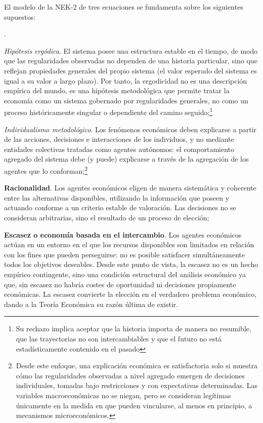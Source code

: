 \documentclass[10pt,a4paper]{article}
\newcounter{numitem}
\newenvironment{lnum}
      {\begin{list}{\arabic{numitem}.}{%
          \usecounter{numitem}%
          \setlength{\leftmargin}{1cm}%
          \setlength{\parskip}{3pt}%
          \setlength{\itemsep}{0pt}%
          \setlength{\parsep}{0pt}%
      }}
      {\end{list}}
\begin{document}
El modelo de la NEK-2 de tres ecuaciones se fundamenta sobre los siguientes supuestos:
\begin{lnum}
    \item \textit{Hipótesis ergódica}. El sistema posee una estructura estable en el tiempo, de modo que las regularidades observadas no dependen de una historia particular, sino que reflejan propiedades generales del propio sistema (el valor esperado del sistema es igual a su valor a largo plazo). Por tanto, la ergodicidad no es una descripción empírica del mundo, es una hipótesis metodológica que permite tratar la economía como un sistema gobernado por regularidades generales, no como un proceso históricamente singular o dependiente del camino seguido;\footnote{%
        Su rechazo implica aceptar que la historia importa de manera no resumible, que las trayectorias no son intercambiables y que el futuro no está estadísticamente contenido en el pasado
    }
    \item \textit{Individualismo metodológico}. Los fenómenos económicos deben explicarse a partir de las acciones, decisiones e interacciones de los individuos, y no mediante entidades colectivas tratadas como agentes autónomos: el comportamiento agregado del sistema debe (y puede) explicarse a través de la agregación de los agentes que lo conforman;\footnote{%
        Desde este enfoque, una explicación económica es satisfactoria solo si muestra cómo las regularidades observadas a nivel agregado emergen de decisiones individuales, tomadas bajo restricciones y con expectativas determinadas. Las variables macroeconómicas no se niegan, pero se consideran legítimas únicamente en la medida en que pueden vincularse, al menos en principio, a mecanismos microeconómicos.
    } 
    \item \textbf{Racionalidad}. Los agentes económicos eligen de manera sistemática y coherente entre las alternativas disponibles, utilizando la información que poseen y actuando conforme a un criterio estable de valoración. Las decisiones no se consideran arbitrarias, sino el resultado de un proceso de elección;
    \item \textbf{Escasez o economía basada en el intercambio}. Los agentes económicos actúan en un entorno en el que los recursos disponibles son limitados en relación con los fines que pueden perseguirse: no es posible satisfacer simultáneamente todos los objetivos deseables. Desde este punto de vista, la escasez no es un hecho empírico contingente, sino una condición estructural del análisis económico ya que, sin escasez no habría costes de oportunidad ni decisiones propiamente económicas. La escasez convierte la elección en el verdadero problema económico, dando a la Teoría Económica su razón última de existir.
\end{lnum}
\end{document}
